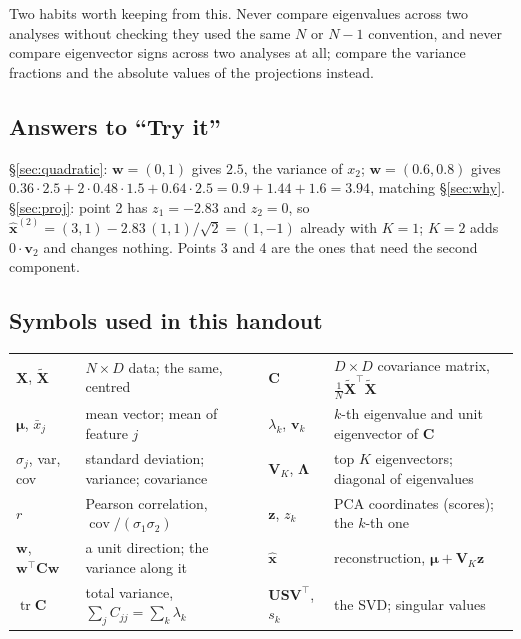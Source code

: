 \documentclass[11pt]{article}
\newcommand{\vx}{\bm{x}}
\newcommand{\vw}{\bm{w}}
\newcommand{\vv}{\bm{v}}
\newcommand{\vz}{\bm{z}}
\newcommand{\vmu}{\bm{\mu}}
\newcommand{\mX}{\bm{X}}
\newcommand{\mC}{\bm{C}}
\newcommand{\mV}{\bm{V}}
\newcommand{\mL}{\bm{\Lambda}}
\begin{document}
Two habits worth keeping from this. Never compare eigenvalues across two analyses without
checking they used the same $N$ or $N-1$ convention, and never compare eigenvector signs
across two analyses at all; compare the variance fractions and the absolute values of the
projections instead.

\subsection*{Answers to ``Try it''}
\S\ref{sec:quadratic}: $\vw = (0, 1)$ gives $2.5$, the variance of $x_2$;
$\vw = (0.6, 0.8)$ gives $0.36\cdot2.5 + 2\cdot0.48\cdot1.5 + 0.64\cdot2.5 = 0.9 + 1.44 + 1.6 = 3.94$,
matching \S\ref{sec:why}.\quad
\S\ref{sec:proj}: point 2 has $z_1 = -2.83$ and $z_2 = 0$, so
$\hat{\vx}^{(2)} = (3, 1) - 2.83\,(1,1)/\sqrt2 = (1, -1)$ already with $K = 1$; $K = 2$ adds
$0\cdot\vv_2$ and changes nothing. Points 3 and 4 are the ones that need the second
component.

\subsection*{Symbols used in this handout}
\begin{center}
\footnotesize
\setlength{\tabcolsep}{4pt}
\begin{tabular}{@{}ll@{\quad}ll@{}}
\toprule
$\mX$, $\tilde{\mX}$ & $N\times D$ data; the same, centred & $\mC$ & $D\times D$ covariance matrix, $\tfrac1N\tilde{\mX}^{\top}\tilde{\mX}$ \\
$\vmu$, $\bar{x}_j$ & mean vector; mean of feature $j$ & $\lambda_k$, $\vv_k$ & $k$-th eigenvalue and unit eigenvector of $\mC$ \\
$\sigma_j$, var, cov & standard deviation; variance; covariance & $\mV_K$, $\mL$ & top $K$ eigenvectors; diagonal of eigenvalues \\
$r$ & Pearson correlation, $\operatorname{cov}/(\sigma_1\sigma_2)$ & $\vz$, $z_k$ & PCA coordinates (scores); the $k$-th one \\
$\vw$, $\vw^{\top}\mC\vw$ & a unit direction; the variance along it & $\hat{\vx}$ & reconstruction, $\vmu + \mV_K\vz$ \\
$\operatorname{tr}\mC$ & total variance, $\sum_j C_{jj} = \sum_k\lambda_k$ & $\bm U\bm S\mV^{\top}$, $s_k$ & the SVD; singular values \\
\bottomrule
\end{tabular}
\end{center}
\end{document}
